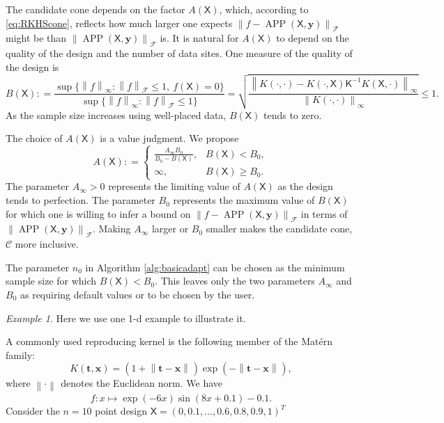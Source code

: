 \documentclass[]{mcom-l}
\theoremstyle{remark}
\newtheorem{example}{Example}
\DeclareMathOperator{\APP}{APP}
\newcommand{\mK}{\mathsf{K}}
\newcommand{\mX}{\mathsf{X}}
\newcommand{\bx}{{\boldsymbol{x}}}
\newcommand{\by}{{\boldsymbol{y}}}
\newcommand{\bt}{{\boldsymbol{t}}}
\newcommand{\cc}{\mathcal{C}}
\newcommand{\calf}{{\mathcal{F}}}
\newcommand{\norm}[2][{}]{\ensuremath{\left \lVert #2 \right \rVert}_{#1}}
\newcommand{\bignorm}[2][{}]{\ensuremath{\bigl \lVert #2 \bigr \rVert}_{#1}}
\begin{document}
The candidate cone depends on the factor $A(\mX)$, which, according to \ref{eq:RKHScone}, reflects how much larger one expects $\bignorm[\calf]{f  - \APP(\mX,\by)}$ might be than $\bignorm[\calf]{\APP(\mX,\by)}$ is.  It is natural for $A(\mX)$ to depend  on the quality of the design and the number of data sites.  One measure of the quality of the design is 
\begin{equation} \label{eq:BX}
B(\mX) : = \frac{ \sup \{\norm[\infty]{f} :  \norm[\calf]{f}  \le 1 , \ f(\mX) = 0 \}   }  {\sup \{ \norm[\infty]{f}  : \norm[\calf]{f}  \le 1  \} }
= \sqrt{ \frac{\norm[\infty]{K(\cdot,\cdot) - K(\cdot,\mX) \mK^{-1} K(\mX,\cdot)}}{\norm[\infty]{K(\cdot,\cdot)}}} \le 1.
\end{equation}
As the sample size increases using well-placed data, $B(\mX)$ tends to zero.

The choice of $A(\mX)$ is  a value judgment.  We propose
\begin{equation} \label{eq:an}
A(\mX): = \begin{cases} \displaystyle
\frac{A_\infty B_0}{B_0 - B(\mX)}, & B(\mX) < B_0, \\
\infty, & B(\mX) \ge B_0.
\end{cases}
\end{equation}
The parameter $A_\infty > 0$ represents the limiting value of $A(\mX)$ as the design tends to perfection.  The parameter $B_0$ represents the maximum value of $B(\mX)$ for which one is willing to infer a bound on $\bignorm[\calf]{f  - \APP(\mX,\by)}$ in terms of $\bignorm[\calf]{\APP(\mX,\by)}$.  Making $A_\infty$ larger or $B_0$ smaller makes the candidate cone, $\cc$ more inclusive.

The parameter $n_0$ in Algorithm \ref{alg:basicadapt} can be chosen as the minimum sample size for which $B(\mX) < B_0$.  This leaves only the two parameters $A_\infty$ and $B_0$ as requiring default values or to be chosen by the user.

\begin{example}
	Here we use one 1-d example to illustrate it.
	
	A commonly used reproducing kernel is the following member of the Mat\'ern family:
	\begin{equation} \label{eq:MaternOne}
	K(\bt,\bx) = (1 +  \norm{\bt-\bx}) \exp(-\norm{\bt-\bx}),
	\end{equation}
	where $\norm{\cdot}$ denotes the Euclidean norm.
	We have \[f: x \mapsto \exp(-6x) \sin(8x+0.1) - 0.1.\]
	Consider the $n=10$ point design $\mX = (0, 0.1, \ldots, 0.6, 0.8, 0.9, 1)^T$
	
	
	
\end{example}
\end{document}
